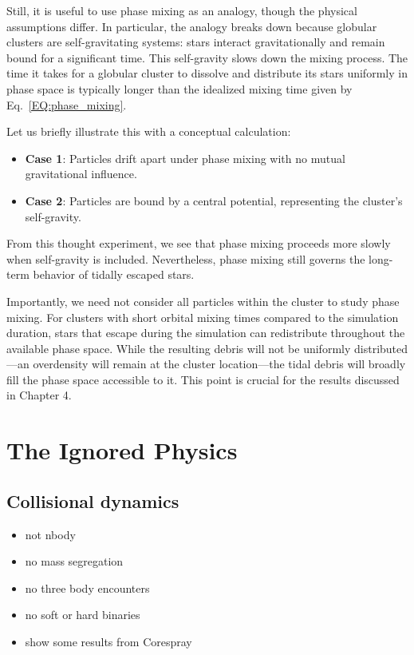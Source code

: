             Still, it is useful to use phase mixing as an analogy, though the physical assumptions differ. In particular, the analogy breaks down because globular clusters are self-gravitating systems: stars interact gravitationally and remain bound for a significant time. This self-gravity slows down the mixing process. The time it takes for a globular cluster to dissolve and distribute its stars uniformly in phase space is typically longer than the idealized mixing time given by Eq.~\ref{EQ:phase_mixing}.

            Let us briefly illustrate this with a conceptual calculation:

            \begin{itemize}
                \item \textbf{Case 1}: Particles drift apart under phase mixing with no mutual gravitational influence.
                \item \textbf{Case 2}: Particles are bound by a central potential, representing the cluster's self-gravity.
            \end{itemize}
            From this thought experiment, we see that phase mixing proceeds more slowly when self-gravity is included. Nevertheless, phase mixing still governs the long-term behavior of tidally escaped stars.

            Importantly, we need not consider all particles within the cluster to study phase mixing. For clusters with short orbital mixing times compared to the simulation duration, stars that escape during the simulation can redistribute throughout the available phase space. While the resulting debris will not be uniformly distributed—an overdensity will remain at the cluster location—the tidal debris will broadly fill the phase space accessible to it. This point is crucial for the results discussed in Chapter 4.




\section{The Ignored Physics}
    \subsection{Collisional dynamics}
        \begin{itemize}
            \item not nbody
            \item no mass segregation
            \item no three body encounters 
            \item no soft or hard binaries 
            \item show some results from Corespray 
        \end{itemize}
    
